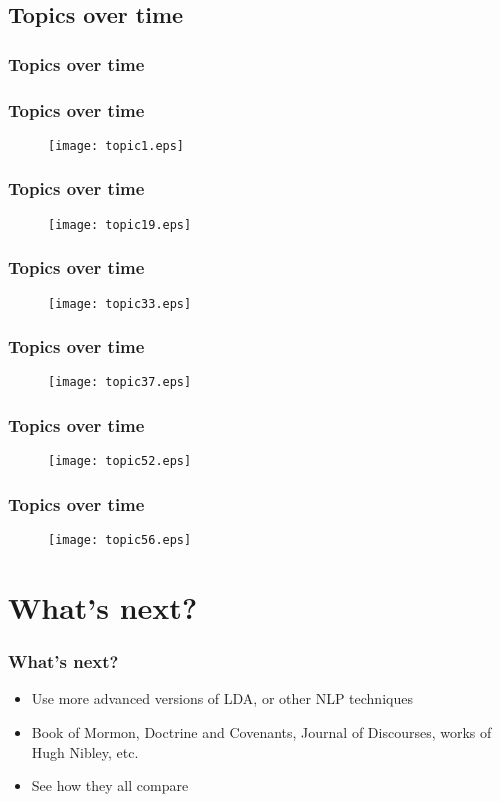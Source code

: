 \documentclass{beamer}
\begin{document}
\subsection{Topics over time}

\begin{frame}
  \frametitle{Topics over time}
\end{frame}

\begin{frame}
  \frametitle{Topics over time}
  \begin{figure}
	\texttt{[image: topic1.eps]}
  \end{figure}
\end{frame}
\begin{frame}
  \frametitle{Topics over time}
  \begin{figure}
	\texttt{[image: topic19.eps]}
  \end{figure}
\end{frame}
\begin{frame}
  \frametitle{Topics over time}
  \begin{figure}
	\texttt{[image: topic33.eps]}
  \end{figure}
\end{frame}
\begin{frame}
  \frametitle{Topics over time}
  \begin{figure}
	\texttt{[image: topic37.eps]}
  \end{figure}
\end{frame}
\begin{frame}
  \frametitle{Topics over time}
  \begin{figure}
	\texttt{[image: topic52.eps]}
  \end{figure}
\end{frame}
\begin{frame}
  \frametitle{Topics over time}
  \begin{figure}
	\texttt{[image: topic56.eps]}
  \end{figure}
\end{frame}

\section{What's next?}

\begin{frame}
  \frametitle{What's next?}
  \begin{itemize}
	\item Use more advanced versions of LDA, or other NLP techniques
	  \pause
	\item Book of Mormon, Doctrine and Covenants, Journal of Discourses,
	  works of Hugh Nibley, etc.
	  \pause
	\item See how they all compare
  \end{itemize}
\end{frame}
\end{document}
